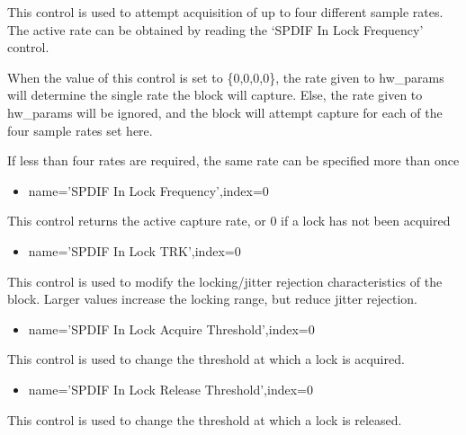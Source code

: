 \documentclass[a4paper,8pt,english]{sphinxmanual}
\begin{document}
This control is used to attempt acquisition of up to four different sample
rates. The active rate can be obtained by reading the `SPDIF In Lock Frequency'
control.

When the value of this control is set to \{0,0,0,0\}, the rate given to hw\_params
will determine the single rate the block will capture. Else, the rate given to
hw\_params will be ignored, and the block will attempt capture for each of the
four sample rates set here.

If less than four rates are required, the same rate can be specified more than
once
\begin{itemize}
\item {} 
name='SPDIF In Lock Frequency',index=0

\end{itemize}

This control returns the active capture rate, or 0 if a lock has not been
acquired
\begin{itemize}
\item {} 
name='SPDIF In Lock TRK',index=0

\end{itemize}

This control is used to modify the locking/jitter rejection characteristics
of the block. Larger values increase the locking range, but reduce jitter
rejection.
\begin{itemize}
\item {} 
name='SPDIF In Lock Acquire Threshold',index=0

\end{itemize}

This control is used to change the threshold at which a lock is acquired.
\begin{itemize}
\item {} 
name='SPDIF In Lock Release Threshold',index=0

\end{itemize}

This control is used to change the threshold at which a lock is released.



\renewcommand{\indexname}{Index}
\printindex
\end{document}
